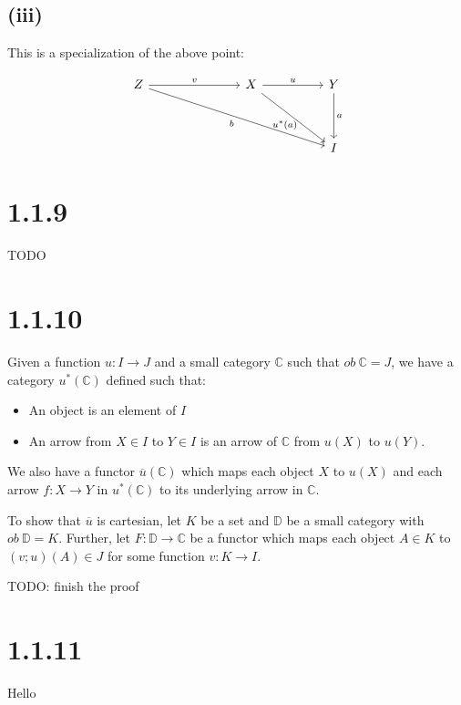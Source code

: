\documentclass{article}
\begin{document}
\subsection*{(iii)}

This is a specialization of the above point:

\[\begin{tikzcd}
	Z &&& X && Y \\
	\\
	&&&&& I
	\arrow["v", from=1-1, to=1-4]
	\arrow["u", from=1-4, to=1-6]
	\arrow["a", from=1-6, to=3-6]
	\arrow["{u^*(a)} \! \! \! \!"', from=1-4, to=3-6]
	\arrow["b"', from=1-1, to=3-6]
\end{tikzcd}\]

\section*{1.1.9}

TODO 

\section*{1.1.10}

Given a function $u : I \to J$ and a small category $\mathbb C$ such that $\mathit{ob}~\mathbb C = J$, we have a category $u^*(\mathbb C)$ defined such that:
\begin{itemize}
\item An object is an element of $I$
\item An arrow from $X \in I$ to $Y \in I$ is an arrow of $\mathbb C$ from $u(X)$ to $u(Y)$.
\end{itemize}

We also have a functor $\overline{u}(\mathbb C)$ which maps each object $X$ to $u(X)$ and each arrow $f : X \to Y$ in $u^*(\mathbb C)$ to its underlying arrow in $\mathbb C$.

To show that $\overline{u}$ is cartesian, let $K$ be a set and $\mathbb D$ be a small category with $\mathit{ob}~\mathbb D = K$. Further, let $F : \mathbb D \to \mathbb C$ be a functor which maps each object $A \in K$ to $(v;u)(A) \in J$ for some function $v : K \to I$.

TODO: finish the proof

\section*{1.1.11}

Hello
\end{document}
